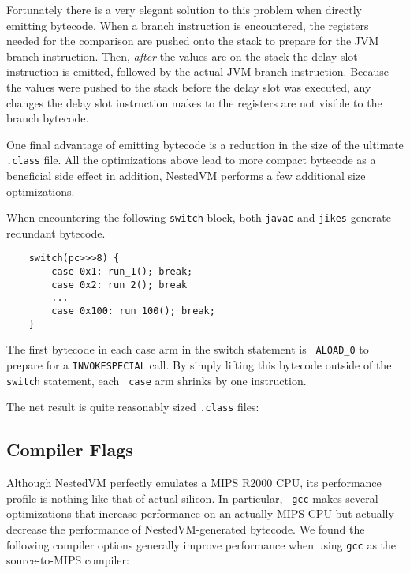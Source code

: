 \documentclass{acmconf}
\begin{document}
Fortunately there is a very elegant solution to this problem when
directly emitting bytecode.  When a branch instruction is encountered,
the registers needed for the comparison are pushed onto the stack to
prepare for the JVM branch instruction.  Then, {\it after} the values
are on the stack the delay slot instruction is emitted, followed by
the actual JVM branch instruction.  Because the values were pushed to
the stack before the delay slot was executed, any changes the delay
slot instruction makes to the registers are not visible to the branch
bytecode.

One final advantage of emitting bytecode is a reduction in the size of
the ultimate {\tt .class} file.  All the optimizations above lead to
more compact bytecode as a beneficial side effect in addition,
NestedVM performs a few additional size optimizations.

When encountering the following {\tt switch} block, both {\tt javac}
and {\tt jikes} generate redundant bytecode.

{\footnotesize\begin{verbatim}
    switch(pc>>>8) {
        case 0x1: run_1(); break;
        case 0x2: run_2(); break
        ...
        case 0x100: run_100(); break;
    }
\end{verbatim}}

The first bytecode in each case arm in the switch statement is {\tt
ALOAD\_0} to prepare for a {\tt INVOKESPECIAL} call.  By simply
lifting this bytecode outside of the {\tt switch} statement, each {\tt
case} arm shrinks by one instruction.

The net result is quite reasonably sized {\tt .class} files:



\subsection{Compiler Flags}

Although NestedVM perfectly emulates a MIPS R2000 CPU, its performance
profile is nothing like that of actual silicon.  In particular, {\tt
gcc} makes several optimizations that increase performance on an
actually MIPS CPU but actually decrease the performance of
NestedVM-generated bytecode.  We found the following compiler options
generally improve performance when using {\tt gcc} as the
source-to-MIPS compiler:
\end{document}
